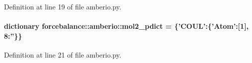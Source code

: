 \-Definition at line 19 of file amberio.\-py.

\hypertarget{namespaceforcebalance_1_1amberio_a7b3741ff909d0776c26574cfee9807fd}{
\paragraph[{mol2\-\_\-pdict}]{\setlength{\rightskip}{0pt plus 5cm}dictionary {\bf forcebalance\-::amberio\-::mol2\-\_\-pdict} = \{'\-C\-O\-U\-L'\-:\{'\-Atom'\-:\mbox{[}1\mbox{]}, 8\-:''\}\}}}\label{namespaceforcebalance_1_1amberio_a7b3741ff909d0776c26574cfee9807fd}


\-Definition at line 21 of file amberio.\-py.

